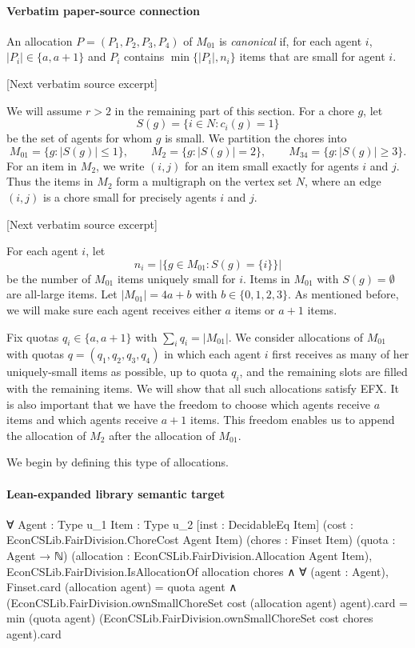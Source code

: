 \documentclass[10pt]{article}
\begin{document}
\paragraph{Verbatim paper-source connection}
\begin{ReviewVerbatim}
An allocation $P=(P_1,P_2,P_3,P_4)$ of $M_{01}$ is \emph{canonical} if, for each agent $i$, $|P_i|\in\{a,a+1\}$ and $P_i$ contains $\min\{|P_i|, n_i\}$ items that are small for agent $i$.

[Next verbatim source excerpt]

We will assume $r>2$ in the remaining part of this section.
For a chore $g$, let
\[
 S(g)=\{i\in N:c_i(g)=1\}
\]
be the set of agents for whom $g$ is small.  We partition the chores into
\[
M_{01}=\{g:|S(g)|\le 1\},\qquad
M_2=\{g:|S(g)|=2\},\qquad
M_{34}=\{g:|S(g)|\ge 3\}.
\]
For an item in $M_2$, we write $(i,j)$ for an item small exactly for agents
$i$ and $j$.  Thus the items in $M_2$ form a multigraph on the vertex set
$N$, where an edge $(i,j)$ is a chore small for precisely agents $i$ and $j$.

[Next verbatim source excerpt]

For each agent $i$, let
\[
 n_i=\left|\{g\in M_{01}:S(g)=\{i\}\}\right|
\]
be the number of $M_{01}$ items uniquely small for $i$.  Items in $M_{01}$
with $S(g)=\emptyset$ are all-large items.
Let $|M_{01}|=4a+b$ with $b\in\{0,1,2,3\}$.
As mentioned before, we will make sure each agent receives either $a$ items or $a+1$ items.

Fix quotas $q_i\in\{a,a+1\}$ with $\sum_i q_i=|M_{01}|$.
We consider allocations of $M_{01}$ with quotas $q=(q_1,q_2,q_3,q_4)$ in which each agent $i$ first receives as many of her uniquely-small items as possible, up to quota $q_i$, and the remaining slots are filled with the remaining items.
We will show that all such allocations satisfy EFX.
It is also important that we have the freedom to choose which agents receive $a$ items and which agents receive $a+1$ items.
This freedom enables us to append the allocation of $M_2$ after the allocation of $M_{01}$.

We begin by defining this type of allocations.
\end{ReviewVerbatim}

\paragraph{Lean-expanded library semantic target}
\begin{ReviewVerbatim}
∀ {Agent : Type u_1} {Item : Type u_2} [inst : DecidableEq Item] (cost : EconCSLib.FairDivision.ChoreCost Agent Item)
  (chores : Finset Item) (quota : Agent → ℕ) (allocation : EconCSLib.FairDivision.Allocation Agent Item),
  EconCSLib.FairDivision.IsAllocationOf allocation chores ∧
    ∀ (agent : Agent),
      Finset.card (allocation agent) = quota agent ∧
        (EconCSLib.FairDivision.ownSmallChoreSet cost (allocation agent) agent).card =
          min (quota agent) (EconCSLib.FairDivision.ownSmallChoreSet cost chores agent).card
\end{ReviewVerbatim}
\end{document}
